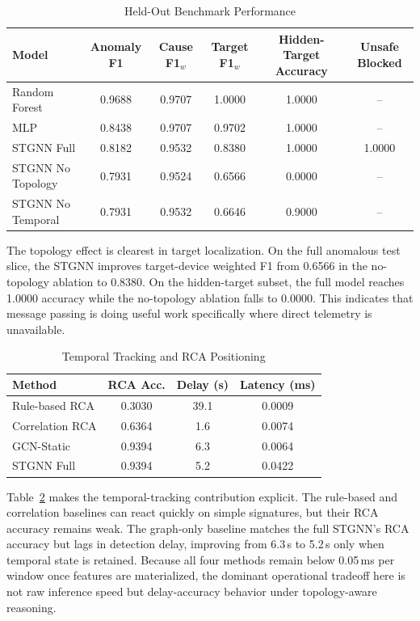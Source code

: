 \documentclass[conference]{IEEEtran}
\begin{document}
\begin{table}[t]
\caption{Held-Out Benchmark Performance}
\label{tab:results}
\centering
\begin{tabular}{lccccc}
\toprule
Model & Anomaly F1 & Cause F1$_w$ & Target F1$_w$ & Hidden-Target Accuracy & Unsafe Blocked \\
\midrule
Random Forest & 0.9688 & 0.9707 & 1.0000 & 1.0000 & -- \\
MLP & 0.8438 & 0.9707 & 0.9702 & 1.0000 & -- \\
STGNN Full & 0.8182 & 0.9532 & 0.8380 & 1.0000 & 1.0000 \\
STGNN No Topology & 0.7931 & 0.9524 & 0.6566 & 0.0000 & -- \\
STGNN No Temporal & 0.7931 & 0.9532 & 0.6646 & 0.9000 & -- \\
\bottomrule
\end{tabular}
\end{table}

The topology effect is clearest in target localization. On the full anomalous test slice, the STGNN improves target-device weighted F1 from 0.6566 in the no-topology ablation to 0.8380. On the hidden-target subset, the full model reaches 1.0000 accuracy while the no-topology ablation falls to 0.0000. This indicates that message passing is doing useful work specifically where direct telemetry is unavailable.

\begin{table}[t]
\caption{Temporal Tracking and RCA Positioning}
\label{tab:temporal}
\centering
\begin{tabular}{lccc}
\toprule
Method & RCA Acc. & Delay (s) & Latency (ms) \\
\midrule
Rule-based RCA & 0.3030 & 39.1 & 0.0009 \\
Correlation RCA & 0.6364 & 1.6 & 0.0074 \\
GCN-Static & 0.9394 & 6.3 & 0.0064 \\
STGNN Full & 0.9394 & 5.2 & 0.0422 \\
\bottomrule
\end{tabular}
\end{table}

Table~\ref{tab:temporal} makes the temporal-tracking contribution explicit. The rule-based and correlation baselines can react quickly on simple signatures, but their RCA accuracy remains weak. The graph-only baseline matches the full STGNN's RCA accuracy but lags in detection delay, improving from 6.3\,s to 5.2\,s only when temporal state is retained. Because all four methods remain below 0.05\,ms per window once features are materialized, the dominant operational tradeoff here is not raw inference speed but delay-accuracy behavior under topology-aware reasoning.
\end{document}
